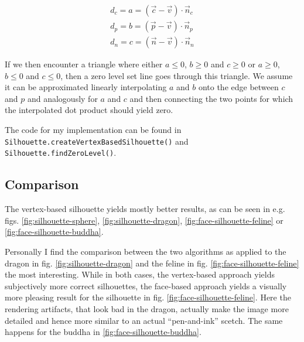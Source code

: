 \documentclass[a4paper,10pt,notitlepage]{scrreprt}
\begin{document}
\begin{eqnarray}
 d_{c} = a = (\vec{c} - \vec{v}) \cdot \vec{n}_c \\
 d_{p} = b = (\vec{p} - \vec{v}) \cdot \vec{n}_p \\
 d_{n} = c = (\vec{n} - \vec{v}) \cdot \vec{n}_n
\end{eqnarray}

If we then encounter a triangle where either $a \leq 0$, $b \geq 0$ and $c \geq
0$ or $a \geq 0$, $b \leq 0$ and $c \leq 0$, then a zero level set line goes
through this triangle. We assume it can be approximated
linearly interpolating $a$ and $b$ onto the edge between $c$ and $p$ and
analogously for $a$ and $c$ and then connecting the two points for which the
interpolated dot product should yield zero.

The code for my implementation can be found in
\texttt{Silhouette.createVertexBasedSilhouette()} and
\texttt{Silhouette.findZeroLevel()}.

\subsection{Comparison}

The vertex-based silhouette yields mostly better results, as can be seen in
e.g. figs. \ref{fig:silhouette-sphere}, \ref{fig:silhouette-dragon},
\ref{fig:face-silhouette-feline} or \ref{fig:face-silhouette-buddha}.

Personally I find the comparison between the two algorithms as
applied to the dragon in fig. \ref{fig:silhouette-dragon} and the feline in fig.
\ref{fig:face-silhouette-feline} the most interesting. While in both cases, the
vertex-based approach yields subjectively more correct silhouettes, the
face-based approach yields a visually more pleasing result for the silhouette
in fig. \ref{fig:face-silhouette-feline}. Here the rendering artifacts, that
look bad in the dragon, actually make the image more detailed and hence more
similar to an actual ``pen-and-ink'' scetch. The same happens for the buddha in
\ref{fig:face-silhouette-buddha}.
\end{document}
